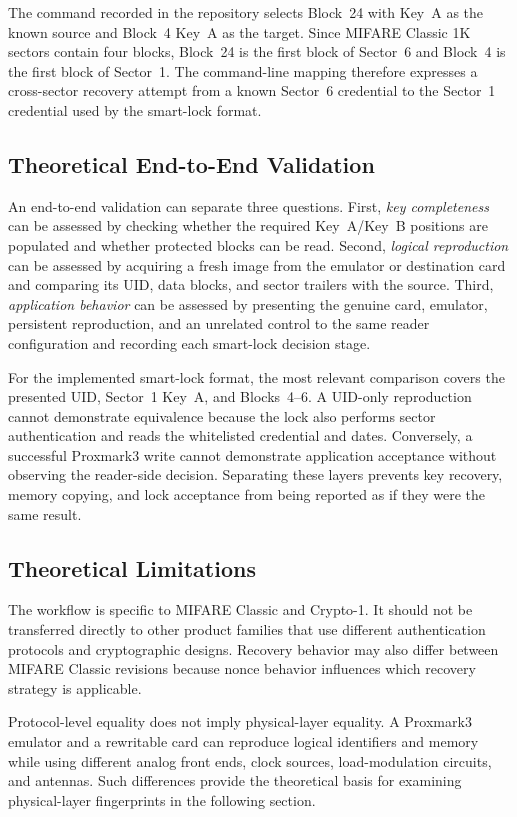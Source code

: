 \documentclass[sigconf]{acmart}
\begin{document}
The command recorded in the repository selects Block~24 with Key~A as the known source and Block~4 Key~A as the target. Since MIFARE Classic 1K sectors contain four blocks, Block~24 is the first block of Sector~6 and Block~4 is the first block of Sector~1. The command-line mapping therefore expresses a cross-sector recovery attempt from a known Sector~6 credential to the Sector~1 credential used by the smart-lock format.

\subsection{Theoretical End-to-End Validation}

An end-to-end validation can separate three questions. First, \emph{key completeness} can be assessed by checking whether the required Key~A/Key~B positions are populated and whether protected blocks can be read. Second, \emph{logical reproduction} can be assessed by acquiring a fresh image from the emulator or destination card and comparing its UID, data blocks, and sector trailers with the source. Third, \emph{application behavior} can be assessed by presenting the genuine card, emulator, persistent reproduction, and an unrelated control to the same reader configuration and recording each smart-lock decision stage.

For the implemented smart-lock format, the most relevant comparison covers the presented UID, Sector~1 Key~A, and Blocks~4--6. A UID-only reproduction cannot demonstrate equivalence because the lock also performs sector authentication and reads the whitelisted credential and dates. Conversely, a successful Proxmark3 write cannot demonstrate application acceptance without observing the reader-side decision. Separating these layers prevents key recovery, memory copying, and lock acceptance from being reported as if they were the same result.

\subsection{Theoretical Limitations}

The workflow is specific to MIFARE Classic and Crypto-1. It should not be transferred directly to other product families that use different authentication protocols and cryptographic designs. Recovery behavior may also differ between MIFARE Classic revisions because nonce behavior influences which recovery strategy is applicable.

Protocol-level equality does not imply physical-layer equality. A Proxmark3 emulator and a rewritable card can reproduce logical identifiers and memory while using different analog front ends, clock sources, load-modulation circuits, and antennas. Such differences provide the theoretical basis for examining physical-layer fingerprints in the following section.
\end{document}
